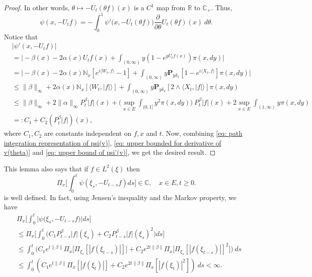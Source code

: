 \documentclass[UTF8]{pkuthss}
\theoremstyle{plain}
\theoremstyle{definition}
\numberwithin{equation}{section}
\begin{document}
\begin{proof}
    In other words, $\theta \mapsto -U_t(\theta f)(x)$ is a $C^1$ map from $\mathbb R$ to $\mathbb C_+$.
    Thus,
\begin{equation}
\label{eq: path integration representation of psi(v)}
    \psi(x,-U_tf)
    = -\int_0^1 \psi'\big(x,-U_t(\theta f)\big) \frac{\partial}{\partial \theta} U_t(\theta f)(x)~d\theta.
\end{equation}
    Notice that
\begin{align}
\label{eq: upper bound of psi'(v)}
    &|\psi'(x, -U_tf)|
    \\&= \Big| -\beta(x)- 2\alpha(x) U_tf(x)+ \int_{(0,\infty)} y (1- e^{y U_tf(x)} ) \pi(x,dy)\Big|
    \\&= \Big| - \beta(x)- 2\alpha(x)\mathbb N_x[e^{i \langle W_t, f\rangle} - 1]  + \int_{(0,\infty)} y \mathbf P_{y \delta_x}[1-e^{i \langle X_t, f\rangle}] \pi(x,dy) \Big|
    \\ &\leq \|\beta\|_\infty + 2\alpha(x)\mathbb N_x[\langle W_t, |f|\rangle]+ \int_{(0,\infty)} y\mathbf P_{y\delta_x}[2\wedge \langle X_t, |f|\rangle] \pi(x,dy)
    \\ &\leq \|\beta\|_\infty + 2\|\alpha\|_\infty
    P^{\beta}_t |f|(x) + \Big(\sup_{x\in E}\int_{(0,1]}y^2 \pi(x,dy)\Big)~P^{\beta}_t |f|(x) + 2\sup_{x\in E}\int_{(1,\infty)} y \pi(x,dy)
    \\ &=: C_1 + C_2(P^{\beta}_t |f|)(x),
\end{align}
    where $C_1, C_2$ are constants independent on $f,x$ and $t$.
    Now, combining \eqref{eq: path integration representation of psi(v)}, \eqref{eq: upper bounded for derivative of v(theta)} and \eqref{eq: upper bound of psi'(v)}, we get the desired result.
\end{proof}

    This lemma also says that if $f\in L^2(\xi)$ then
\[
    \Pi_x\Big[\int_0^t \psi(\xi_s,- U_{t-s}f)ds\Big]
    \in \mathbb C,
    \quad x\in E, t\geq 0.
\]
    is well defined.
    In fact, using Jensen's inequality and the Markov property, we have
\begin{align}
\label{eq: domination of psi(v)}
    &\Pi_x\Big[\int_0^t \big|\psi \big(\xi_s,-U_{t-s}f\big)\big|ds\Big]
    \\&\leq \Pi_x\Big[\int_0^t \big(C_1 P_{t-s}^{\beta}|f|(\xi_s)+C_2 P_{t-s}^{\beta}|f|(\xi_s)^2\big)ds\Big]
    \\ &\leq \int_0^t \big(C_1 e^{t\|\beta\|}\Pi_x \big[ \Pi_{\xi_s}[|f(\xi_{t-s})|] \big]+C_2 e^{2t\|\beta\|}\Pi_x \big[ \Pi_{\xi_s}[|f (\xi_{t-s})|]^2 \big]\big)~ds
    \\ &\leq \int_0^t (C_1 e^{t\|\beta\|}\Pi_x [ |f(\xi_{t})|]+C_2e^{2t\|\beta\|}\Pi_x [ |f (\xi_{t})|^2 ])~ds < \infty.
\end{align}
\end{document}
